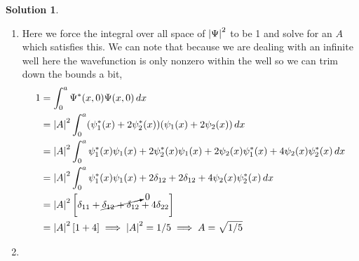 \documentclass[10pt]{article}
\theoremstyle{definition}
\newtheorem{soln}{Solution}
\begin{document}
\begin{soln}~
  \begin{enumerate}[label=(\alph*)]
    \item Here we force the integral over all space of $\abs{\Psi}^2$ to be 1 and solve for an $A$ which satisfies this. We can note
          that because we are dealing with an infinite well here the wavefunction is only nonzero within the well so we can trim down the bounds a bit,
          \begin{align*}
            1 & =\int_{0}^{a}\Psi^*(x,0)\Psi(x,0)\,dx                                                                            \\
              & =\abs{A}^2\int_{0}^{a}(\psi_1^*(x)+2\psi_2^*(x))(\psi_1(x)+2\psi_2(x))\,dx                                       \\
              & =\abs{A}^2\int_{0}^{a}\psi_1^*(x)\psi_1(x)+2\psi_2^*(x)\psi_1(x)+2\psi_2(x)\psi_1^*(x)+4\psi_2(x)\psi_2^*(x)\,dx \\
              & =\abs{A}^2\int_{0}^{a}\psi_1^*(x)\psi_1(x)+2\delta_{12}+2\delta_{12}+4\psi_2(x)\psi_2^*(x)\,dx                   \\
              & =\abs{A}^2\left[\delta_{11}+\cancelto{0}{\delta_{12}+\delta_{12}}+4\delta_{22}\right]                            \\
              & =\abs{A}^2\left[1+4\right]\implies \abs{A}^2=1/5\implies A=\sqrt{1/5}
          \end{align*}
    \item ~\\
          \begin{center}
\end{center}
\end{enumerate}
\end{soln}
\end{document}
